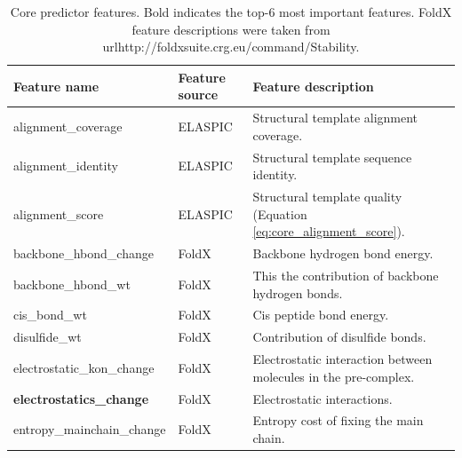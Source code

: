 \begin{table}[!htb]
	\centering
	\caption[Core predictor features.]{Core predictor features. Bold indicates the top-6 most important features. FoldX feature descriptions were taken from url{http://foldxsuite.crg.eu/command/Stability}.}
	\label{tab:core_features}
	\begin{tabular}{ l | l | p{7cm} }
		\toprule
		Feature name                              & Feature source & Feature description                                                                                 \\
		\midrule
		alignment\_coverage                       & ELASPIC        & Structural template alignment coverage.                                                             \\
		alignment\_identity                       & ELASPIC        & Structural template sequence identity.                                                              \\
		alignment\_score                          & ELASPIC        & Structural template quality (Equation \ref{eq:core_alignment_score}).                               \\
		backbone\_hbond\_change                   & FoldX          & Backbone hydrogen bond energy.                                                                      \\
		backbone\_hbond\_wt                       & FoldX          & This the contribution of backbone hydrogen bonds.                                                   \\
		cis\_bond\_wt                             & FoldX          & Cis peptide bond energy.                                                                            \\
		disulfide\_wt                             & FoldX          & Contribution of disulfide bonds.                                                                    \\
		electrostatic\_kon\_change                & FoldX          & Electrostatic interaction between molecules in the pre-complex.                                     \\
		\textbf{electrostatics\_change}           & FoldX          & Electrostatic interactions.                                                                         \\
		entropy\_mainchain\_change                & FoldX          & Entropy cost of fixing the main chain.                                                              \\

\end{tabular}
\end{table}

